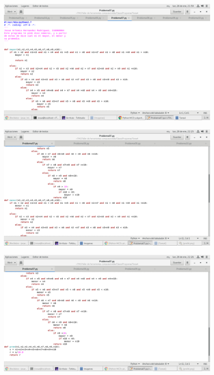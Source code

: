 \label{key}\documentclass[letterpaper, 12pt,oneside]{article}
\begin{document}
	\begin{figure}[h]
		\includegraphics[scale=0.15]{pro07.png}
		
	\end{figure}
\begin{figure}[h]
	\includegraphics[scale=.15]{pro07_1.png}
	
\end{figure}
	\begin{figure}[h]
		\includegraphics[scale=0.15]{pro07_2.png}
	\end{figure}
	
	
	
	
	
	
	
	
	
	
\end{document}
